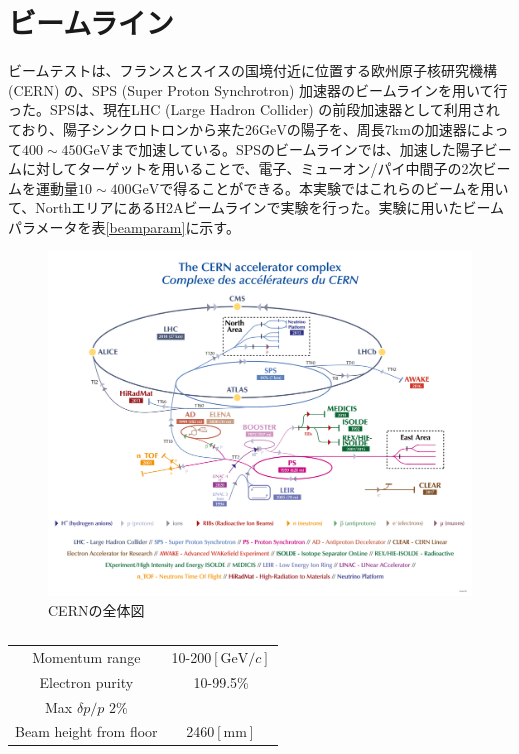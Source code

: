 \section{ビームライン}
ビームテストは、フランスとスイスの国境付近に位置する欧州原子核研究機構 (CERN) の、SPS (Super Proton Synchrotron) 加速器のビームラインを用いて行った。SPSは、現在LHC (Large Hadron Collider) の前段加速器として利用されており、陽子シンクロトロンから来た26$\mathrm{GeV}$の陽子を、周長7kmの加速器によって$400\sim 450 \mathrm{GeV}$まで加速している。SPSのビームラインでは、加速した陽子ビームに対してターゲットを用いることで、電子、ミューオン/パイ中間子の2次ビームを運動量$10\sim 400 \mathrm{GeV}$で得ることができる。本実験ではこれらのビームを用いて、NorthエリアにあるH2Aビームラインで実験を行った。実験に用いたビームパラメータを表\ref{beamparam}に示す。\\
\begin{figure}[H]
	\begin{center}
 \includegraphics[keepaspectratio, scale=0.7]
 	{Figure/Beamtest/cern.png}
 		\caption{CERNの全体図}
	\end{center}
\end{figure}
\begin{table}[H]
 \centering
 \begin{tabular}{c c}
 \hline
Momentum range & 10-200$[ \mathrm{GeV}/ c ]$\\
Electron purity & 10-99.5\%\\
Max $\delta p / p$ $2\%$& \\
Beam height from floor & 2460$[ \mathrm{mm}]$\\
 \hline
 \end{tabular}
 \label{layer}
 \caption{}
\end{table}

